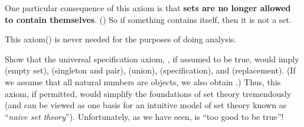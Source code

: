 \begin{note}
One particular consequence of this axiom is that \textbf{sets are no longer allowed to contain themselves}.
() So if something contains itself, then it is not a set.
\end{note}

\begin{note}
This axiom() is never needed for the purposes of doing analysis.
\end{note}

\exercisesection

\begin{exercise} \label{exercise 3.2.1}
Show that the universal specification axiom, , if assumed to be true, would imply  (empty set),  (singleton and pair),  (union),  (specification), and  (replacement). (If we assume that all natural numbers are objects, we also obtain .)
Thus, this axiom, if permitted, would simplify the foundations of set theory tremendously (and can be viewed as one basis for an intuitive model of set theory known as ``\emph{naive set theory}'').
Unfortunately, as we have seen,  is ``too good to be true''!
\end{exercise}

